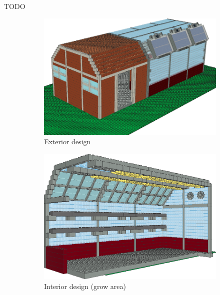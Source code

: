 \documentclass{PDS}
\begin{document}
TODO

\begin{figure}[htbp]
    \centering
    \begin{subfigure}[b]{0.3\textwidth}
        \centering
        \includegraphics[width=\textwidth]{./figures/glasshouse_1.png}
        \caption{Exterior design}
        \label{fig:glasshouse_1}
    \end{subfigure}
    \hfill
    \begin{subfigure}[b]{0.3\textwidth}
        \centering
        \includegraphics[width=\textwidth]{./figures/glasshouse_2.png}
        \caption{Interior design (grow area)}
        \label{fig:glasshouse_2}
    \end{subfigure}
    \hfill
    \begin{subfigure}[b]{0.3\textwidth}
        \centering

\end{subfigure}
\end{figure}
\end{document}
